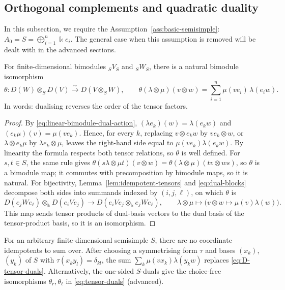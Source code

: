 \subsection{Orthogonal complements and quadratic duality}

In this subsection, we require the Assumption~\ref{ass:basic-semisimple}: $A_0=S=\bigoplus_{i=1}^n\Bbbk e_i$.  The general case when this assumption is removed will be dealt with in the advanced sections.

\begin{proposition}\label{prop:D-tensor-duals}
For finite-dimensional bimodules ${}_SV_S$ and ${}_SW_S$, there is a natural bimodule isomorphism
\begin{equation}\label{eq:D-tensor-duals}
\theta:D(W)\otimes_S D(V)\xrightarrow{\sim}D(V\otimes_S W),\qquad
\theta(\lambda\otimes\mu)(v\otimes w)=\sum_{i=1}^n\mu(ve_i)\,\lambda(e_iw).
\end{equation}
In words: dualising reverses the order of the tensor factors.
\end{proposition}

\begin{supplementary}
\begin{proof}
By \eqref{eq:linear-bimodule-dual-action}, $(\lambda e_k)(w)=\lambda(e_kw)$ and $(e_k\mu)(v)=\mu(ve_k)$.
Hence, for every $k$, replacing $v\otimes e_kw$ by $ve_k\otimes w$, or $\lambda\otimes e_k\mu$ by $\lambda e_k\otimes\mu$, leaves the right-hand side equal to $\mu(ve_k)\lambda(e_kw)$.
By linearity the formula respects both tensor relations, so $\theta$ is well defined.
For $s,t\in S$, the same rule gives $\theta(s\lambda\otimes\mu t)(v\otimes w)=\theta(\lambda\otimes\mu)(tv\otimes ws)$, so $\theta$ is a bimodule map; it commutes with precomposition by bimodule maps, so it is natural.
For bijectivity, Lemma~\ref{lem:idempotent-tensors} and \eqref{eq:dual-blocks} decompose both sides into summands indexed by $(i,j,\ell)$, on which $\theta$ is
\[
D(e_jWe_\ell)\otimes_\Bbbk D(e_iVe_j)\longrightarrow D(e_iVe_j\otimes_\Bbbk e_jWe_\ell),\qquad
\lambda\otimes\mu\longmapsto\bigl(v\otimes w\mapsto\mu(v)\lambda(w)\bigr).
\]
This map sends tensor products of dual-basis vectors to the dual basis of the tensor-product basis, so it is an isomorphism.
\end{proof}
\end{supplementary}
\begin{advanced}
\begin{remark}[General $S$]
For an arbitrary finite-dimensional semisimple $S$, there are no coordinate idempotents to sum over.
After choosing a symmetrising form $\tau$ and bases $(x_k)$, $(y_k)$ of $S$ with $\tau(x_ky_l)=\delta_{kl}$, the sum $\sum_k\mu(vx_k)\lambda(y_kw)$ replaces \eqref{eq:D-tensor-duals}.
Alternatively, the one-sided $S$-duals give the choice-free isomorphisms $\theta_r,\theta_\ell$ in \eqref{eq:tensor-duals} (advanced).
\end{remark}
\end{advanced}

